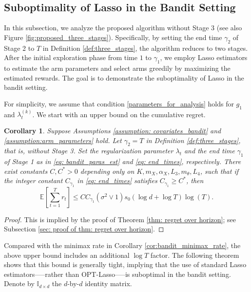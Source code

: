 \documentclass[aos,preprint]{imsart}
\theoremstyle{plain}
\newtheorem{corollary}[theorem]{Corollary}
\theoremstyle{definition}
\newcommand{\Exp}{\mathbb{E}}
\begin{document}
 




\subsection{Suboptimality of Lasso in the Bandit Setting}\label{subsec:lasso_bandit}
In this subsection, we analyze the proposed algorithm without Stage 3 (see also Figure \ref{fig:proposed_three_stages}). Specifically, by setting the end time $\gamma_2$ of Stage 2 to $T$ in Definition \ref{def:three_stages}, the algorithm reduces to two stages. After the initial exploration phase from time $1$ to $\gamma_1$, we employ Lasso estimators to estimate the arm parameters and select arms greedily by maximizing the estimated rewards. The goal is to demonstrate the suboptimality of Lasso in the bandit setting.

For simplicity, we assume that condition \eqref{parameters_for_analysis} holds for $g_1$ and $\lambda_t^{(k)}$. We start with an upper bound on the cumulative regret.


 

\begin{corollary} 
Suppose Assumptions \ref{assumption: covariates_bandit} and \ref{assumption:arm_parameters} hold. 
Let $\gamma_2 = T$ in Definition \ref{def:three_stages}, that is, without Stage 3. 
Set the regularization parameter $\lambda_t$ and the end time $\gamma_1$ of Stage 1 as in \eqref{eq: bandit_paras_est} and \eqref{eq: end_times}, respectively. There exist constants $C,C^* > 0$ depending only on $K,  m_X, \alpha_X,  L_3, m_{\theta}, L_4$, such that
 if the integer constant $C_{\gamma_1}$ in \eqref{eq: end_times} satisfies  $C_{\gamma_1} \geq C^*$, then
$$
\Exp\left[\sum_{t=1}^T r_t \right] \le C C_{\gamma_1} (\sigma^2\vee 1)  s_0(\log d + \log T)\log(T).
$$ 
\end{corollary}
\begin{proof}
This is implied by the proof of Theorem \ref{thm: regret over horizon}; see Subsection \ref{sec: proof of thm: regret over horizon}.
\end{proof}

Compared with the minimax rate in Corollary \ref{cor:bandit_minimax_rate}, the above upper bound includes an additional $\log T$ factor. The following theorem shows that this bound is generally tight, implying that the use of standard Lasso estimators--—rather than OPT-Lasso—--is suboptimal in the bandit setting. Denote by $\mathbb{I}_{d \times d}$ the $d$-by-$d$ identity matrix.
\end{document}
